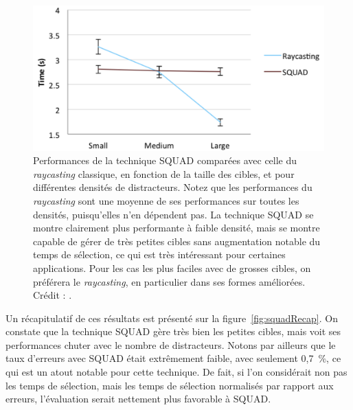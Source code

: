 	\begin{figure}[ht]
		\centering
		\includegraphics[width=\textwidth]{figures/ch2/squadSize}
		\caption[SQUAD -- résultats : récapitulatif]{Performances de la technique SQUAD comparées avec celle du \emph{raycasting} classique, en fonction de la taille des cibles, et pour différentes densités de distracteurs. Notez que les performances du \emph{raycasting} sont une moyenne de ses performances sur toutes les densités, puisqu'elles n'en dépendent pas. La technique SQUAD se montre clairement plus performante à faible densité, mais se montre capable de gérer de très petites cibles sans augmentation notable du temps de sélection, ce qui est très intéressant pour certaines applications. Pour les cas les plus faciles avec de grosses cibles, on préférera le \emph{raycasting}, en particulier dans ses formes améliorées. Crédit : \cite{kopper2011rapid}.}
		\label{fig:squadSize}
	\end{figure}
	
	Un récapitulatif de ces résultats est présenté sur la figure~\ref{fig:squadRecap}. On constate que la technique SQUAD gère très bien les petites cibles, mais voit ses performances chuter avec le nombre de distracteurs. Notons par ailleurs que le taux d'erreurs avec SQUAD était extrêmement faible, avec seulement 0,7~\%{}, ce qui est un atout notable pour cette technique. De fait, si l'on considérait non pas les temps de sélection, mais les temps de sélection normalisés par rapport aux erreurs, l'évaluation serait nettement plus favorable à SQUAD.
	
